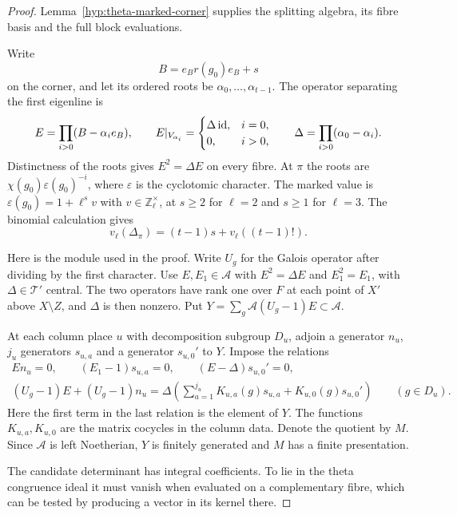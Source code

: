 \begin{proof}
Lemma~\ref{hyp:theta-marked-corner} supplies the splitting algebra, its fibre basis and the full block evaluations.

Write
\[
 B=e_Br(g_0)e_B+s
\]
on the corner, and let its ordered
roots be \(\alpha_0,\ldots,\alpha_{t-1}\). The operator separating
the first eigenline is
\[
 E=\prod_{i>0}(B-\alpha_i e_B),\qquad
 E|_{V_{\alpha_i}}=
 \begin{cases}\Delta\,{\rm id},&i=0,\\0,&i>0,\end{cases}
 \qquad\Delta=\prod_{i>0}(\alpha_0-\alpha_i).
\]
Distinctness of the roots gives \(E^2=\Delta E\) on every fibre.
At \(\pi\) the roots are \(\chi(g_0)\varepsilon(g_0)^{-i}\), where
\(\varepsilon\) is the cyclotomic character. The
marked value is \(\varepsilon(g_0)=1+\ell^s v\)
with \(v\in\mathbb Z_\ell^\times\), at \(s\ge2\) for
\(\ell=2\) and \(s\ge1\) for \(\ell=3\).
The binomial calculation gives
\[
     v_\ell(\Delta_\pi)=(t-1)s+v_\ell((t-1)!).
\]
\label{cor:congruence-determinant-1}

Here is the module used in the proof. Write \(U_g\) for the
Galois operator after dividing by the first character.
Use \(E,E_1\in\mathcal A\) with \(E^2=\Delta E\) and
\(E_1^2=E_1\), with \(\Delta\in\mathcal T'\) central.
The two operators have rank one over \(F\) at each
point of \(X'\) above \(X\setminus Z\), and
\(\Delta\) is then nonzero. Put
\(Y=\sum_g\mathcal A (U_g-1)E\subset\mathcal A\).

At each column place \(u\) with decomposition subgroup
\(D_u\), adjoin a generator \(n_u\), \(j_u\) generators
\(s_{u,a}\) and a generator \(s_{u,0}'\) to \(Y\).
Impose the relations
\[
 \begin{gathered}
 E n_u=0,\qquad (E_1-1)s_{u,a}=0,\qquad
 (E-\Delta)s_{u,0}'=0,\\
 (U_g-1)E+(U_g-1)n_u
     =\Delta\left(\sum_{a=1}^{j_u}K_{u,a}(g)s_{u,a}
                  +K_{u,0}(g)s_{u,0}'\right)\qquad(g\in D_u).
 \end{gathered}
\]
Here the first term in the last relation is the
element of \(Y\). The functions \(K_{u,a},K_{u,0}\)
are the matrix cocycles in the column data. Denote the
quotient by \(M\). Since \(\mathcal A\) is left
Noetherian, \(Y\) is finitely generated and \(M\)
has a finite presentation.

The candidate determinant has integral coefficients. To lie in the theta congruence ideal it must vanish when evaluated on a complementary fibre, which can be tested by producing a vector in its kernel there.


\end{proof}
